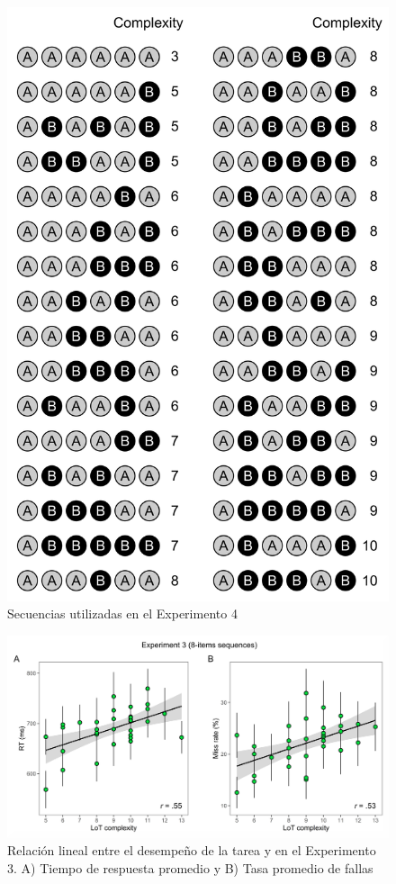 \begin{figure}[t!]
      \includegraphics[scale=0.8]{figuras/plosbio/journal.pcbi.1008598.s004.png}
      \centering
      \caption{Secuencias utilizadas en el Experimento 4}
      \label{PlosBIO-S4}
\end{figure}

\begin{figure}[t!]
      \includegraphics[scale=0.8]{figuras/plosbio/journal.pcbi.1008598.s005.png}
      \centering
      \caption{Relación lineal entre el desempeño de la tarea y \mdlbin en el Experimento 3. A) Tiempo de respuesta promedio y B) Tasa promedio de fallas}
      \label{PlosBIO-S5}
\end{figure}

